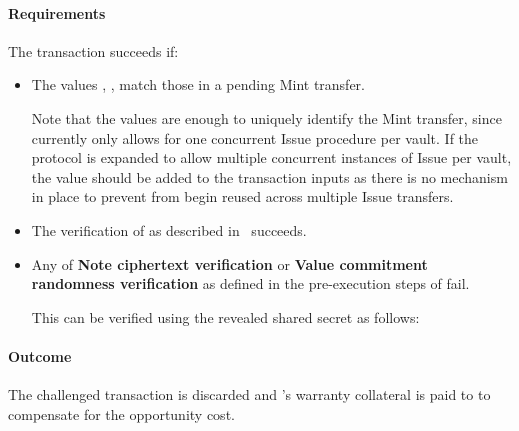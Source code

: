 \paragraph{Requirements}
The \challengeIssue transaction succeeds if:
\begin{itemize}
    \item The values \dvf, \pkd, \epkn match those in a pending Mint transfer.
    
    Note that the values \dpa are enough to uniquely identify the Mint transfer, since \zclaim currently only allows for one concurrent Issue procedure per vault.
    If the protocol is expanded to allow multiple concurrent instances of Issue per vault, the value \nlock should be added to the \challengeRedeem transaction inputs as there is no mechanism in place to prevent \epkn from begin reused across multiple Issue transfers.
    \item The verification of \pic as described in~\cite[Appendix B.2]{hopwood2016zcash} succeeds.
    \item Any of \textbf{Note ciphertext verification} or \textbf{Value commitment randomness verification} as defined in the pre-execution steps of \confirmIssueop fail.
    
    This can be verified using the revealed shared secret as follows:
\end{itemize}

\paragraph{Outcome}
The challenged \mint transaction is discarded and \issuer's warranty collateral \iw is paid to \vault to compensate for the opportunity cost.

